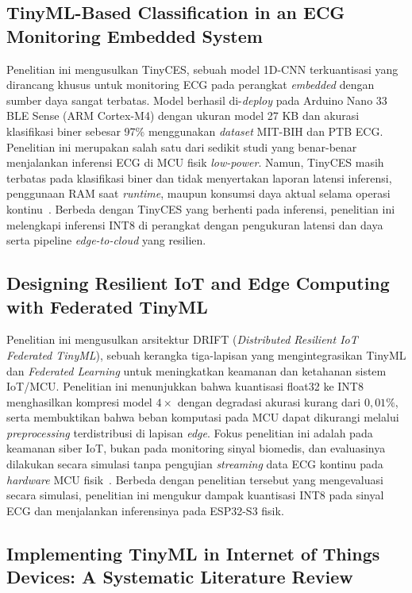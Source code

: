 \subsection{TinyML-Based Classification in an ECG Monitoring Embedded System}
\label{subsec:related-kim2023}

Penelitian ini mengusulkan TinyCES, sebuah model 1D-CNN terkuantisasi yang dirancang khusus untuk monitoring ECG pada perangkat \textit{embedded} dengan sumber daya sangat terbatas. Model berhasil di-\textit{deploy} pada Arduino Nano 33 BLE Sense (ARM Cortex-M4) dengan ukuran model 27 KB dan akurasi klasifikasi biner sebesar 97\% menggunakan \textit{dataset} MIT-BIH dan PTB ECG. Penelitian ini merupakan salah satu dari sedikit studi yang benar-benar menjalankan inferensi ECG di MCU fisik \textit{low-power}. Namun, TinyCES masih terbatas pada klasifikasi biner dan tidak menyertakan laporan latensi inferensi, penggunaan RAM saat \textit{runtime}, maupun konsumsi daya aktual selama operasi kontinu~\cite{kim_2023}. Berbeda dengan TinyCES yang berhenti pada inferensi, penelitian ini melengkapi inferensi INT8 di perangkat dengan pengukuran latensi dan daya serta pipeline \textit{edge-to-cloud} yang resilien.

\subsection{Designing Resilient IoT and Edge Computing with Federated TinyML}
\label{subsec:related-laiu2026}

Penelitian ini mengusulkan arsitektur DRIFT (\textit{Distributed Resilient IoT Federated TinyML}), sebuah kerangka tiga-lapisan yang mengintegrasikan TinyML dan \textit{Federated Learning} untuk meningkatkan keamanan dan ketahanan sistem IoT/MCU. Penelitian ini menunjukkan bahwa kuantisasi float32 ke INT8 menghasilkan kompresi model $4\times$ dengan degradasi akurasi kurang dari $0{,}01\%$, serta membuktikan bahwa beban komputasi pada MCU dapat dikurangi melalui \textit{preprocessing} terdistribusi di lapisan \textit{edge}. Fokus penelitian ini adalah pada keamanan siber IoT, bukan pada monitoring sinyal biomedis, dan evaluasinya dilakukan secara simulasi tanpa pengujian \textit{streaming} data ECG kontinu pada \textit{hardware} MCU fisik~\cite{laiu_2026}. Berbeda dengan penelitian tersebut yang mengevaluasi secara simulasi, penelitian ini mengukur dampak kuantisasi INT8 pada sinyal ECG dan menjalankan inferensinya pada ESP32-S3 fisik.

\subsection{Implementing TinyML in Internet of Things Devices: A Systematic Literature Review}
\label{subsec:related-solispino2026}

